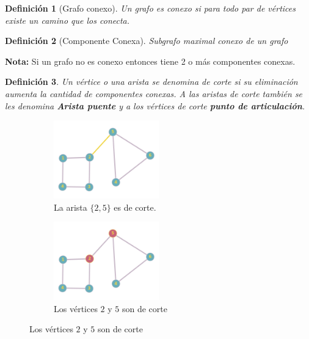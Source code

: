 \documentclass[a4paper,1pt]{report}
\newtheorem*{dfn}{Definición}
\begin{document}
\begin{dfn}[Grafo conexo]
    Un grafo es conexo si para todo par de vértices existe un camino que los conecta.
\end{dfn}

\begin{dfn}[Componente Conexa]
    Subgrafo maximal conexo de un grafo
\end{dfn}

\textbf{Nota:} Si un grafo no es conexo entonces tiene 2 o m\'as componentes conexas.

\begin{dfn}
    Un v\'ertice o una arista se denomina de corte si su eliminaci\'on aumenta la cantidad de componentes conexas. A las aristas de corte tambi\'en se les denomina \textbf{Arista puente} y a los v\'ertices de corte \textbf{punto de articulaci\'on}. 
\end{dfn}

\begin{figure}[H]
    \centering
    \begin{subfigure}[b]{0.45\textwidth}
    \centering
    \includegraphics[width=0.5\textwidth]{figures2/aristaCorte.png}
    \caption{La arista $\{2,5\}$ es de corte.}
    \end{subfigure}
    \begin{subfigure}[b]{0.45\textwidth}
        \centering
    \includegraphics[width=0.5\textwidth]{figures2/verticesCorte.png}
    \caption{Los v\'ertices $2$ y $5$ son de corte}
    \end{subfigure}
\end{figure} 
\end{document}
